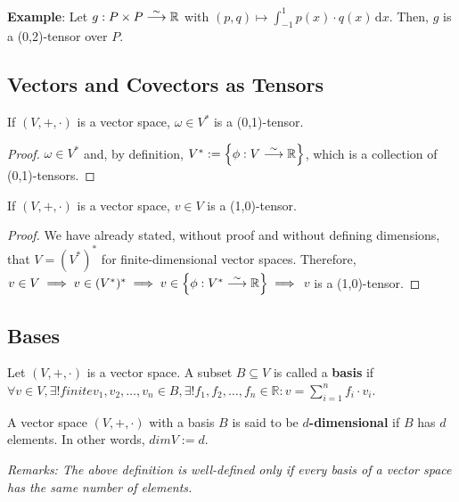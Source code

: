 \textbf{Example}: Let $g : P \times P \stackrel{\sim}{\longrightarrow} \mathbb{R}$ with $(p,q) \mapsto \int_{-1}^1 \! p(x) \cdot q(x) \, \mathrm{d}x$. Then, $g$ is a (0,2)-tensor over $P$.

\subsection{Vectors and Covectors as Tensors}
\begin{theorem}
If $(V,+,\cdot)$ is a vector space, $\omega \in V^\ast$ is a (0,1)-tensor.
\end{theorem}
\begin{proof}
$\omega \in V^\ast$ and, by definition, $V^{\ast} := \left\lbrace \phi : V \stackrel{\sim}{\longrightarrow} \mathbb{R} \right\rbrace$, which is a collection of (0,1)-tensors. 
\end{proof}

\begin{theorem}
If $(V,+,\cdot)$ is a vector space, $v \in V$ is a (1,0)-tensor.
\end{theorem}
\begin{proof}
We have already stated, without proof and without defining dimensions, that $V = (V^\ast)^\ast$ for finite-dimensional vector spaces. Therefore, $v \in V \implies v \in (V^\ast)^\ast \implies v \in \left\lbrace \phi : V^\ast \stackrel{\sim}{\longrightarrow} \mathbb{R} \right\rbrace \implies$ $v$ is a (1,0)-tensor.
\end{proof}

\subsection{Bases}
\begin{definition}
Let $(V,+,\cdot)$ is a vector space. A subset $B \subseteq V$ is called a \textbf{basis} if \\
$\forall v \in V, \exists ! finite v_1,v_2,\dotsc,v_n \in B, \exists ! f_1,f_2,\dotsc,f_n \in \mathbb{R} : v = \displaystyle\sum_{i=1}^n f_i \cdot v_i$. 
\end{definition}

\begin{definition}
A vector space $(V,+,\cdot)$ with a basis $B$ is said to be \textbf{$d$-dimensional} if $B$ has $d$ elements. In other words, $dim V := d$.
\end{definition}

\textit{Remarks: The above definition is well-defined only if every basis of a vector space has the same number of elements.}

